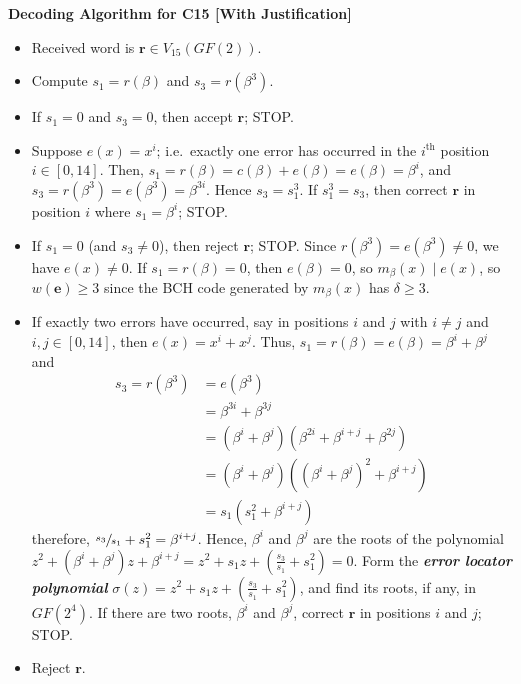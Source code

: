 \begin{algbox}
    \textbf{Decoding Algorithm for C15 [With Justification]}
    \begin{itemize}
        \item Received word is $ \bm{r}\in V_{15}(GF(2)) $.
        \item Compute $ s_1=r(\beta) $ and $ s_3=r(\beta^3) $.
        \item If $ s_1=0 $ and $ s_3=0 $, then accept $ \bm{r} $; STOP\@.
        \item Suppose $ e(x)=x^i $; i.e.\ exactly one error has occurred in the $ i^{\text{th}} $
              position $ i\in[0,14] $. Then, $ s_1=r(\beta)=c(\beta)+e(\beta)=e(\beta)=\beta^i $,
              and $ s_3=r(\beta^3)=e(\beta^3)=\beta^{3i} $. Hence $ s_3=s_1^3 $.
              If $ s_1^3=s_3 $, then correct $ \bm{r} $ in position $ i $ where $ s_1=\beta^i $;
              STOP\@.
        \item If $ s_1=0 $ (and $ s_3\neq 0 $), then reject $ \bm{r} $; STOP\@.
              Since $ r(\beta^3)=e(\beta^3)\neq 0 $, we have $ e(x)\neq 0 $. If $ s_1=r(\beta)=0 $,
              then $ e(\beta)=0 $, so $ m_{\beta}(x)\mid e(x) $, so $ w(\bm{e})\geqslant 3 $
              since the BCH code generated by $ m_{\beta}(x) $ has $ \delta\geqslant 3 $.
        \item If exactly two errors have occurred, say in positions $ i $ and $ j $ with
              $ i\neq j $ and $ i,j\in[0,14] $, then $ e(x)=x^i+x^j $. Thus, $ s_1=r(\beta)=
                  e(\beta)=\beta^i+\beta^j $ and
              \begin{align*}
                  s_3=r(\beta^3)
                   & =e(\beta^3)                                           \\
                   & =\beta^{3i}+\beta^{3j}                                \\
                   & =(\beta^i+\beta^j)(\beta^{2i}+\beta^{i+j}+\beta^{2j}) \\
                   & =(\beta^i+\beta^j)((\beta^i+\beta^j)^2+\beta^{i+j})   \\
                   & =s_1(s_1^2+\beta^{i+j})
              \end{align*}
              therefore, $ \sfrac{s_3}{s_1}+s_1^2=\beta^{i+j} $. Hence, $ \beta^i $
              and $ \beta^j $ are the roots of the polynomial $ z^2+(\beta^i+\beta^j)z+\beta^{i+j}=
                  z^2+s_1z+\left( \frac{s_3}{s_1} +s_1^2 \right)=0 $. Form the
              \textbf\emph{{error locator polynomial}}
              $ \sigma(z)=z^2+s_1z+\left( \frac{s_3}{s_1} +s_1^2 \right) $, and find its
              roots, if any, in $ GF(2^4) $. If there are two roots, $ \beta^i $
              and $ \beta^j $, correct $ \bm{r} $ in positions $ i $ and $ j $; STOP\@.
        \item Reject $ \bm{r} $.
    \end{itemize}
\end{algbox}

